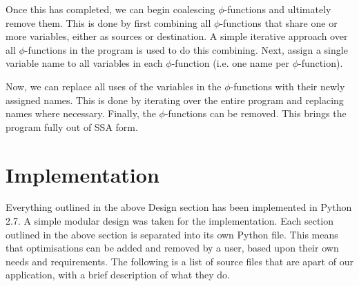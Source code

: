\documentclass[a4paper,10pt]{report}
\begin{document}
Once this has completed, we can begin coalescing \(\phi\)-functions and ultimately remove them. This is done by first combining
all \(\phi\)-functions that share one or more variables, either as sources or destination. A simple iterative approach over all 
\(\phi\)-functions in the program is used to do this combining. Next, assign a single variable name to all variables in each 
\(\phi\)-function (i.e. one name per \(\phi\)-function). 

Now, we can replace all uses of the variables in the \(\phi\)-functions with their newly assigned names. This is done by iterating
over the entire program and replacing names where necessary. Finally, the \(\phi\)-functions can be removed. This brings the program
fully out of SSA form.

\chapter{Implementation}
Everything outlined in the above Design section has been implemented in Python 2.7. A simple modular design was taken for the
implementation. Each section outlined in the above section is separated into its own Python file. This means that optimisations
can be added and removed by a user, based upon their own needs and requirements. The following is a list of source files that
are apart of our application, with a brief description of what they do.
\end{document}
